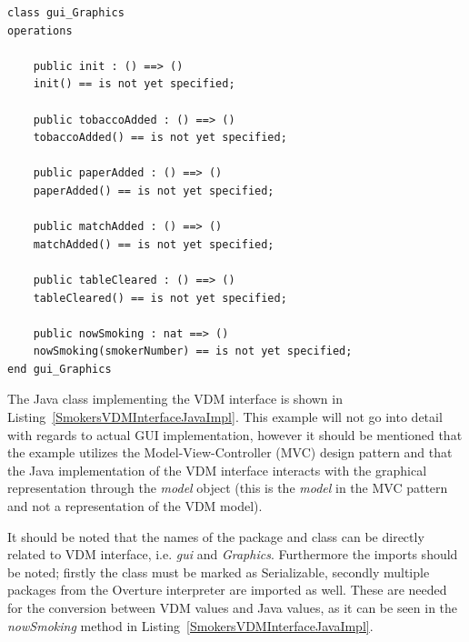 \documentclass{overturerepchap}
\begin{document}
\begin{lstlisting}[language=VDM++,label=SmokersVDMInterface,caption=VDM interface for external Java library,captionpos=b]
class gui_Graphics
operations

    public init : () ==> ()
	init() == is not yet specified;

	public tobaccoAdded : () ==> ()
	tobaccoAdded() == is not yet specified;

	public paperAdded : () ==> ()
	paperAdded() == is not yet specified;

	public matchAdded : () ==> ()
	matchAdded() == is not yet specified;

	public tableCleared : () ==> ()
	tableCleared() == is not yet specified;

	public nowSmoking : nat ==> ()
	nowSmoking(smokerNumber) == is not yet specified;
end gui_Graphics
\end{lstlisting}

The Java class implementing the VDM interface is shown in Listing~\ref{SmokersVDMInterfaceJavaImpl}. This example will not go into detail with regards to actual GUI implementation, however it should be mentioned that the example utilizes the Model-View-Controller (MVC) design pattern and that the Java implementation of the VDM interface interacts with the graphical representation through the \textit{model} object (this is the \textit{model} in the MVC pattern and not a representation of the VDM model).

It should be noted that the names of the package and class can be directly related to VDM interface, i.e. \textit{gui} and \textit{Graphics}. Furthermore the imports should be noted; firstly the class must be marked as Serializable, secondly multiple packages from the Overture interpreter are imported as well. These are needed for the conversion between VDM values and Java values, as it can be seen in the \textit{nowSmoking} method in Listing~\ref{SmokersVDMInterfaceJavaImpl}. 
\end{document}
